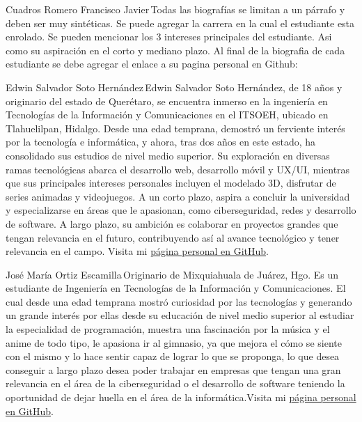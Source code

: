 \documentclass{IEEEcsmag}
\begin{document}
\begin{IEEEbiography}{Cuadros Romero Francisco Javier}{\,}Todas las biografías se limitan a un párrafo y deben ser muy sintéticas. Se puede agregar la carrera en la cual el estudiante esta enrolado. Se pueden mencionar los 3 intereses principales del estudiante. Asi como su aspiración en el corto y mediano plazo. Al final de la biografia de cada estudiante se debe agregar el enlace a su pagina personal en Github: 
\end{IEEEbiography}
\begin{IEEEbiography}{Edwin Salvador Soto Hernández}{\,}Edwin Salvador Soto Hernández, de 18 años y originario del estado de Querétaro, se encuentra inmerso en la ingeniería en Tecnologías de la Información y Comunicaciones en el ITSOEH, ubicado en Tlahuelilpan, Hidalgo. Desde una edad temprana, demostró un ferviente interés por la tecnología e informática, y ahora, tras dos años en este estado, ha consolidado sus estudios de nivel medio superior. Su exploración en diversas ramas tecnológicas abarca el desarrollo web, desarrollo móvil y UX/UI, mientras que sus principales intereses personales incluyen el modelado 3D, disfrutar de series animadas y videojuegos. A un corto plazo, aspira a concluir la universidad y especializarse en áreas que le apasionan, como ciberseguridad, redes y desarrollo de software. A largo plazo, su ambición es colaborar en proyectos grandes que tengan relevancia en el futuro, contribuyendo así al avance tecnológico y tener relevancia en el campo. Visita mi \href{https://edwinsotohz.github.io/}{página personal en GitHub}.
\end{IEEEbiography}
\begin{IEEEbiography}{José María Ortiz Escamilla}{\,}Originario de Mixquiahuala de Juárez, Hgo. Es un estudiante de Ingeniería en Tecnologías de la Información y Comunicaciones. El cual desde una edad temprana mostró curiosidad por las tecnologías y generando un grande interés por ellas desde su educación de nivel medio superior al estudiar la especialidad de programación, muestra una fascinación por la música y el anime de todo tipo, le apasiona ir al gimnasio, ya que mejora el cómo se siente con el mismo y lo hace sentir capaz de lograr lo que se proponga, lo que desea conseguir a largo plazo desea poder trabajar en empresas que tengan una gran relevancia en el área de la ciberseguridad o el desarrollo de software teniendo la oportunidad de dejar huella en el área de la informática.Visita mi \href{https://joseoe.github.io/}{página personal en GitHub}.
\end{IEEEbiography}
\end{document}
